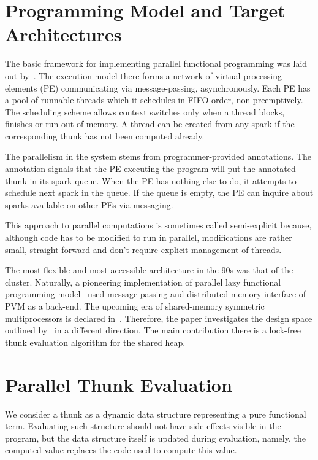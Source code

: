 \documentclass[11pt]{extarticle}
\begin{document}
\section{Programming Model and Target Architectures}

The basic framework for implementing parallel functional programming was laid out by~\cite{Trinder96}. The execution model there forms a network of virtual processing elements (PE) communicating via message-passing, asynchronously. Each PE has a pool of runnable threads which it schedules in FIFO order, non-preemptively. The scheduling scheme allows context switches only when a thread blocks, finishes or run out of memory. A thread can be created from any spark if the corresponding thunk has not been computed already. 

The parallelism in the system stems from programmer-provided annotations. The annotation signals that the PE executing the program will put the annotated thunk in its spark queue. When the PE has nothing else to do, it attempts to schedule next spark in the queue. If the queue is empty, the PE can inquire about sparks available on other PEs via messaging.

This approach to parallel computations is sometimes called semi-explicit because, although code has to be modified to run in parallel, modifications are rather small, straight-forward and don't require explicit management of threads.

The most flexible and most accessible architecture in the 90s was that of the cluster. Naturally, a pioneering implementation of parallel lazy functional programming model~\cite{Trinder96} used message passing and distributed memory interface of PVM as a back-end. The upcoming era of shared-memory symmetric multiprocessors is declared in~\cite{Harris05}. Therefore, the paper investigates the design space outlined by~\cite{Trinder96} in a different direction. The main contribution there is a lock-free thunk evaluation algorithm for the shared heap.

\section{Parallel Thunk Evaluation}

We consider a thunk as a dynamic data structure representing a pure functional term. Evaluating such structure should not have side effects visible in the program, but the data structure itself is updated during evaluation, namely, the computed value replaces the code used to compute this value.
\end{document}
